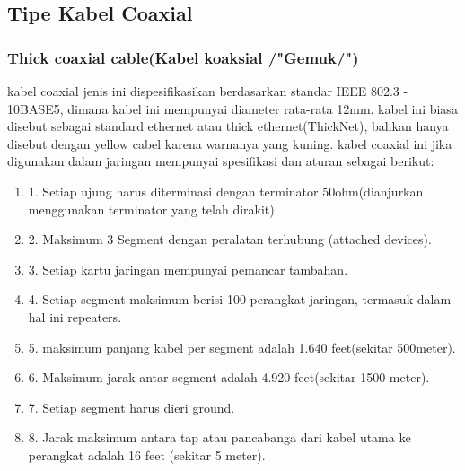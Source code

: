 	\subsection{Tipe Kabel Coaxial}
		\subsubsection{Thick coaxial cable(Kabel koaksial /"Gemuk/")}
		kabel coaxial jenis ini dispesifikasikan berdasarkan standar IEEE 802.3 - 10BASE5, dimana kabel ini mempunyai diameter rata-rata 12mm. kabel ini biasa disebut sebagai standard ethernet atau thick ethernet(ThickNet), bahkan hanya disebut dengan yellow cabel karena warnanya yang kuning.
		kabel coaxial ini jika digunakan dalam jaringan mempunyai spesifikasi dan aturan sebagai berikut:
			\begin{enumerate}
				\item 1. Setiap ujung harus diterminasi dengan terminator 50ohm(dianjurkan menggunakan terminator yang telah dirakit)
				\item 2. Maksimum 3 Segment dengan peralatan terhubung (attached devices).
				\item 3. Setiap kartu jaringan mempunyai pemancar tambahan.
				\item 4. Setiap segment maksimum berisi 100 perangkat jaringan, termasuk dalam hal ini repeaters.
				\item 5. maksimum panjang kabel per segment adalah 1.640 feet(sekitar 500meter).
				\item 6. Maksimum jarak antar segment adalah 4.920 feet(sekitar 1500 meter).
				\item 7. Setiap segment harus dieri ground.
				\item 8. Jarak maksimum antara tap atau pancabanga dari kabel utama ke perangkat adalah 16 feet (sekitar 5 meter).
			\end{enumerate}
